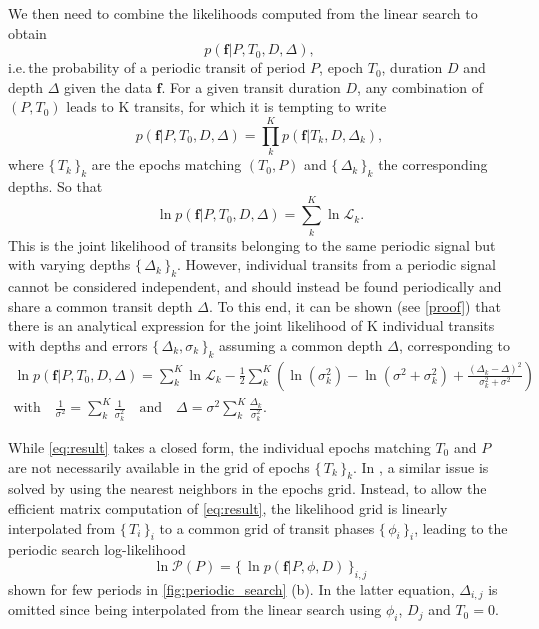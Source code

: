 \documentclass{aastex631}
\newcommand{\set}[1]{\{\,#1\,\}}
\begin{document}
We then need to combine the likelihoods computed from the linear search to obtain
\begin{equation*}
    p(\bm{f} \vert P, T_0 , D, \Delta),
\end{equation*}
i.e.\,the probability of a periodic transit of period $P$, epoch $T_0$, duration $D$ and depth $\Delta$ given the data $\bm{f}$. For a given transit duration $D$, any combination of $(P, T_0)$ leads to K transits, for which it is tempting to write
\begin{equation}\label{eq:attempt}
    p(\bm{f} \vert P, T_0 ,D, \Delta) = \prod_k^K p(\bm{f} \vert T_k, D, \Delta_k),
\end{equation}
where $\set{T_k}_k$ are the epochs matching $(T_0, P)$ and $\set{\Delta_k}_k$ the corresponding depths. So that
\begin{equation*}
    \ln p(\bm{f} \vert P, T_0 ,D, \Delta) = \sum_k^K \ln \mathcal{L}_k.
\end{equation*}
This is the joint likelihood of transits belonging to the same periodic signal but with varying depths  $\set{\Delta_k}_k$. However, individual transits from a periodic signal cannot be considered independent, and should instead be found periodically and share a common transit depth $\Delta$. To this end, it can be shown (see \autoref{proof}) that there is an analytical expression for the joint likelihood of K individual transits with depths and errors $\set{\Delta_k, \sigma_k}_k$ assuming a common depth $\Delta$, corresponding to 
\begin{equation}\label{eq:result}
    \begin{gathered}
        \ln p(\bm{f} \vert P, T_0 ,D, \Delta) =  \sum_{k}^K \ln \mathcal{L}_k  - \frac{1}{2} \sum_k^K\left(\ln(\sigma_{k}^2) - \ln(\sigma^{2} + \sigma_{k}^{2}) +  \frac{\left(\Delta_{k} -
        \Delta\right)^{2}}{\sigma_k^{2} + \sigma^{2}}\right) \\
        \text{with} \quad  \frac{1}{\sigma^2} = \sum_k^K \frac{1}{\sigma_k^2} \quad \text{and} \quad
        \Delta = \sigma^2 \sum_k^K {\frac{\Delta_k}{\sigma_k^2}}.
    \end{gathered}
\end{equation}

While \autoref{eq:result} takes a closed form, the individual epochs matching $T_0$ and $P$ are not necessarily available in the grid of epochs $\set{T_k}_k$. In \cite{foreman2016}, a similar issue is solved by using the nearest neighbors in the epochs grid. Instead, to allow the efficient matrix computation of \autoref{eq:result}, the likelihood grid is linearly interpolated from $\set{T_i}_i$ to a common grid of transit phases $\set{\phi_i}_i$, leading to the periodic search log-likelihood
$$\ln\mathcal{P}(P) = \set{\ln p(\bm{f} \vert P, \phi, D)}_{i,j}$$
shown for few periods in \autoref{fig:periodic_search} (b). In the latter equation, $\Delta_{i,j}$ is omitted since being interpolated from the linear search using $\phi_i$, $D_j$ and $T_0 = 0$.
\end{document}
